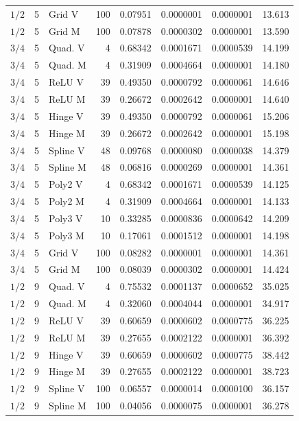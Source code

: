 \begin{longtable}{rrlrrrrr}
$1/2$ & 5 & Grid V & 100 & 0.07951 & 0.0000001 & 0.0000001 & 13.613\\
$1/2$ & 5 & Grid M & 100 & 0.07878 & 0.0000302 & 0.0000001 & 13.590\\
$3/4$ & 5 & Quad. V & 4 & 0.68342 & 0.0001671 & 0.0000539 & 14.199\\
$3/4$ & 5 & Quad. M & 4 & 0.31909 & 0.0004664 & 0.0000001 & 14.180\\
$3/4$ & 5 & ReLU V & 39 & 0.49350 & 0.0000792 & 0.0000061 & 14.646\\
$3/4$ & 5 & ReLU M & 39 & 0.26672 & 0.0002642 & 0.0000001 & 14.640\\
$3/4$ & 5 & Hinge V & 39 & 0.49350 & 0.0000792 & 0.0000061 & 15.206\\
$3/4$ & 5 & Hinge M & 39 & 0.26672 & 0.0002642 & 0.0000001 & 15.198\\
$3/4$ & 5 & Spline V & 48 & 0.09768 & 0.0000080 & 0.0000038 & 14.379\\
$3/4$ & 5 & Spline M & 48 & 0.06816 & 0.0000269 & 0.0000001 & 14.361\\
$3/4$ & 5 & Poly2 V & 4 & 0.68342 & 0.0001671 & 0.0000539 & 14.125\\
$3/4$ & 5 & Poly2 M & 4 & 0.31909 & 0.0004664 & 0.0000001 & 14.133\\
$3/4$ & 5 & Poly3 V & 10 & 0.33285 & 0.0000836 & 0.0000642 & 14.209\\
$3/4$ & 5 & Poly3 M & 10 & 0.17061 & 0.0001512 & 0.0000001 & 14.198\\
$3/4$ & 5 & Grid V & 100 & 0.08282 & 0.0000001 & 0.0000001 & 14.361\\
$3/4$ & 5 & Grid M & 100 & 0.08039 & 0.0000302 & 0.0000001 & 14.424\\
$1/2$ & 9 & Quad. V & 4 & 0.75532 & 0.0001137 & 0.0000652 & 35.025\\
$1/2$ & 9 & Quad. M & 4 & 0.32060 & 0.0004044 & 0.0000001 & 34.917\\
$1/2$ & 9 & ReLU V & 39 & 0.60659 & 0.0000602 & 0.0000775 & 36.225\\
$1/2$ & 9 & ReLU M & 39 & 0.27655 & 0.0002122 & 0.0000001 & 36.392\\
$1/2$ & 9 & Hinge V & 39 & 0.60659 & 0.0000602 & 0.0000775 & 38.442\\
$1/2$ & 9 & Hinge M & 39 & 0.27655 & 0.0002122 & 0.0000001 & 38.723\\
$1/2$ & 9 & Spline V & 100 & 0.06557 & 0.0000014 & 0.0000100 & 36.157\\
$1/2$ & 9 & Spline M & 100 & 0.04056 & 0.0000075 & 0.0000001 & 36.278\\

\end{longtable}
